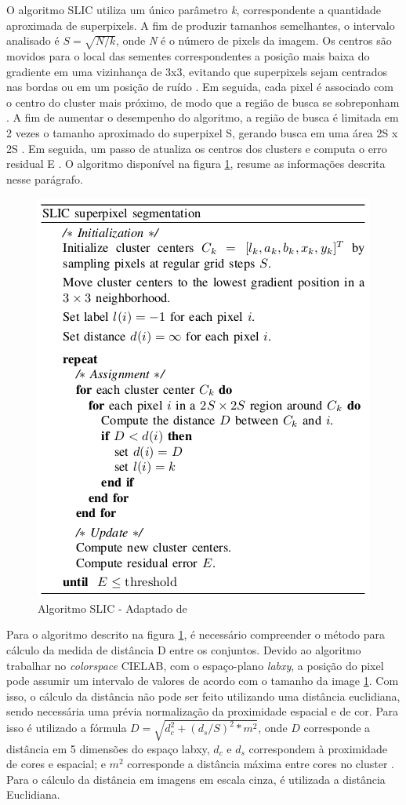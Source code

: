 \begin{document}
O algoritmo SLIC utiliza um único parâmetro \textit{k}, correspondente a quantidade aproximada de superpixels. A fim de produzir tamanhos semelhantes, o intervalo analisado é $S=\sqrt{N/k}$, onde \textit{N} é o número de pixels da imagem. Os centros são movidos para o local das sementes correspondentes a posição mais baixa do gradiente em uma vizinhança de 3x3, evitando que superpixels sejam centrados nas bordas ou em um posição de ruído \cite{SLIC}. Em seguida, 
cada pixel é associado com o centro do cluster mais próximo, de modo que a região de busca se sobreponham \cite{SLIC}. A fim de aumentar o desempenho do algoritmo, a região de busca é limitada em 2 vezes o tamanho aproximado do superpixel S, gerando busca em uma área 2S x 2S \cite{SLIC}. Em seguida, um passo de atualiza os centros dos clusters e computa o erro residual E \cite{SLIC}. O algoritmo disponível na figura \ref{alg:SLIC}, resume as informações descrita nesse parágrafo.

\begin{figure}[ht]
\centering
\includegraphics[width=.6\textwidth]{algoritmo_slic.png}
\caption{Algoritmo SLIC - Adaptado de \cite{SLIC}}
\label{alg:SLIC}
\end{figure}

Para o algoritmo descrito na figura \ref{alg:SLIC}, é necessário compreender o método para cálculo da medida de distância D entre os conjuntos. Devido ao algoritmo trabalhar no \textit{colorspace} CIELAB, com o espaço-plano \textit{labxy}, a posição do pixel pode assumir um intervalo de valores de acordo com o tamanho da image \ref{alg:SLIC}. Com isso, o cálculo da distância não pode ser feito utilizando uma distância euclidiana, sendo necessária uma prévia normalização da proximidade espacial e de cor. Para isso é utilizado a fórmula $D=\sqrt{d_c^2+(d_s/S)^2*m^2}$, onde $D$ corresponde a distância em 5 dimensões do espaço labxy, $d_c$ e $d_s$ correspondem à proximidade de cores e espacial; e $m^2$ corresponde a distância máxima entre cores no cluster \cite{SLIC}. Para o cálculo da distância em imagens em escala cinza, é utilizada a distância Euclidiana.
\end{document}

